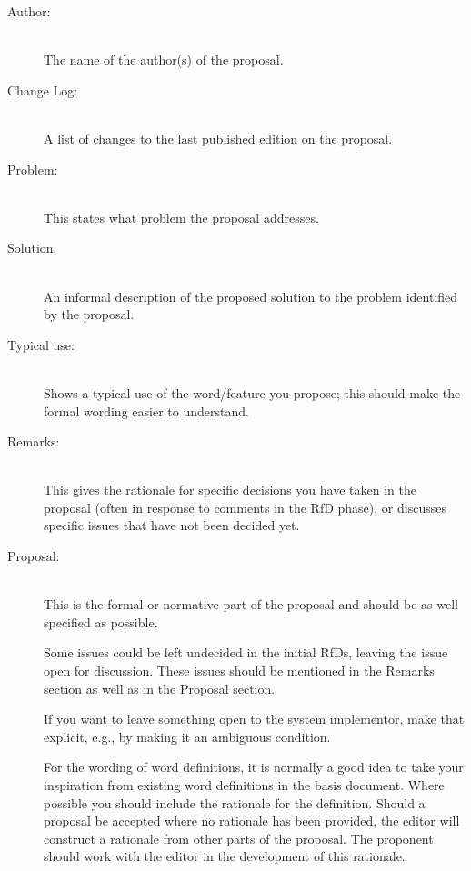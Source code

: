 \begin{description}
\item[Author:] ~\\
	The name of the author(s) of the proposal.

\item[Change Log:] ~\\
	A list of changes to the last published edition on the proposal.

\item[Problem:] ~\\
	This states what problem the proposal addresses.

\item[Solution:] ~\\
	An informal description of the proposed solution to the problem
	identified by the proposal.

\item[Typical use:] ~\\
	Shows a typical use of the word/feature you propose; this should
	make the formal wording easier to understand.

\item[Remarks:] ~\\
	This gives the rationale for specific decisions you have taken in
	the proposal (often in response to comments in the RfD phase), or
	discusses specific issues that have not been decided yet.

\item[Proposal:] ~\\
	This is the formal or normative part of the proposal and should be
	as well specified as possible.

	Some issues could be left undecided in the initial RfDs, leaving
	the issue open for discussion.  These issues should be mentioned
	in the Remarks section as well as in the Proposal section.

	If you want to leave something open to the system implementor, make
	that explicit, e.g., by making it an ambiguous condition.

	For the wording of word definitions, it is normally a good idea to
	take your inspiration from existing word definitions in the basis
	document.  Where possible you should include the rationale for the
	definition.  Should a proposal be accepted where no rationale has
	been provided, the editor will construct a rationale from other
	parts of the proposal.  The proponent should work with the editor
	in the development of this rationale.


\end{description}
